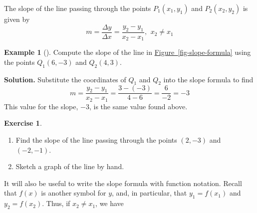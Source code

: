 \documentclass[10pt,]{book}
\theoremstyle{plain}
\theoremstyle{definition}
\theoremstyle{definition}
\theoremstyle{definition}
\newtheorem{example}[theorem]{Example}
\theoremstyle{definition}
\theoremstyle{definition}
\newtheorem{exercise}[theorem]{Exercise}
\numberwithin{equation}{section}
\begin{document}
        The slope of the line passing through the points \(P_1 (x_1, y_1)\) and \(P_2 (x_2, y_2)\) is given by
        \begin{equation*}m = \frac{\Delta y}{\Delta x}= \frac{y_2 − y_1}{x_2 − x_1} 
            \text{, }~x_2 \ne x_1\end{equation*}
\begin{example}[]\label{example-two-point-slope}
Compute the slope of the line in \hyperref[fig-slope-formula]{Figure~\ref{fig-slope-formula}} using the points \(Q_1 (6, −3)\) and \(Q_2 (4, 3)\). %
\par\medskip\noindent%
\textbf{Solution.}\quad 
        Substitute the coordinates of \(Q_1\) and \(Q_2\) into the slope formula to find
        \begin{equation*}m = \frac{y_2 − y_1}{x_2 − x_1}= \frac{3 − (−3)}{4 − 6}
        = \frac{6}{-2}= −3\end{equation*}
        This value for the slope, \(−3\), is the same value found above.
    \end{example}
\begin{exercise}\label{exercise-two-point-slope}
\leavevmode%
\begin{enumerate}[label=*\alph**]
\item\hypertarget{li-151}{}Find the slope of the line passing through the points \((2, −3)\) and \(( −2, −1)\).\item\hypertarget{li-152}{}Sketch a graph of the line by hand.\end{enumerate}
\end{exercise}

    It will also be useful to write the slope formula with function notation. Recall that \(f (x)\) is another symbol for \(y\), and, in particular, that \(y_1 = f (x_1)\) and \(y_2 = f (x_2)\). Thus, if \(x_2 \ne x_1\), we have
%
\typeout{************************************************}
\typeout{************************************************}
\end{document}
